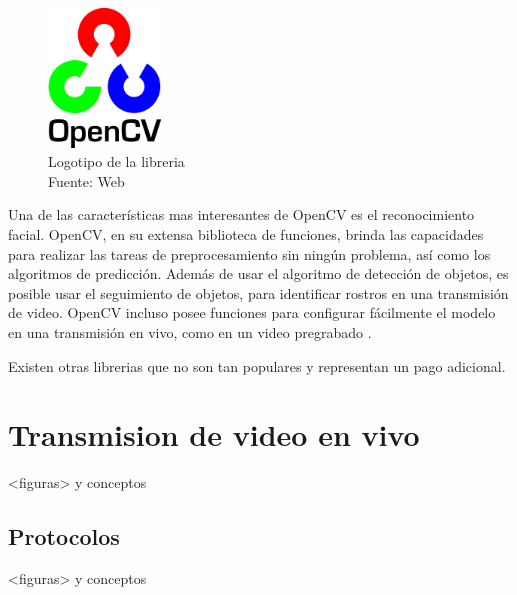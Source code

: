 \begin{figure}[H]
    \begin{center}
        \includegraphics[width=3cm]{img/capitulo_2/cv2_logo.png}
    \end{center}
    \caption{Logotipo de la libreria\\Fuente: Web}
    \label{fig:cv2_logo}
\end{figure}

Una de las características mas interesantes de OpenCV es el reconocimiento facial. OpenCV, en su extensa biblioteca de funciones, brinda las capacidades para realizar las tareas de preprocesamiento sin ningún problema, así como los algoritmos de predicción. Además de usar el algoritmo de detección de objetos, es posible usar el seguimiento de objetos, para identificar rostros en una transmisión de video. OpenCV incluso posee funciones para configurar fácilmente el modelo en una transmisión en vivo, como en un video pregrabado \cite{medium:opencv}. 

Existen otras librerias que no son tan populares y representan un pago adicional.

\section{Transmision de video en vivo}
<figuras> y conceptos

\subsection{Protocolos}
<figuras> y conceptos

